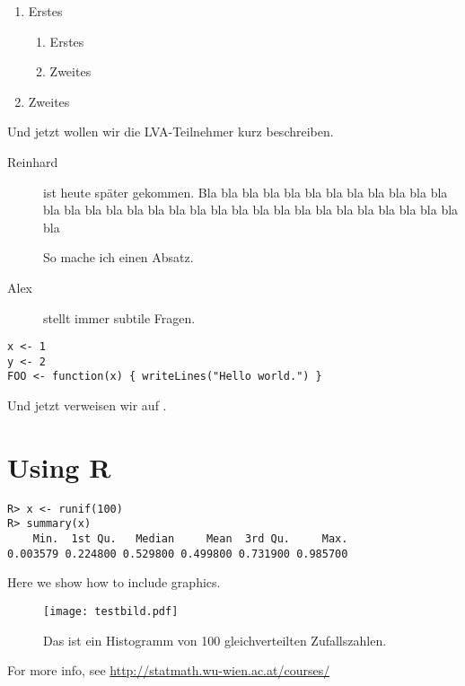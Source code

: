 \documentclass{article}
\begin{document}
\begin{enumerate}
 \item Erstes
  \begin{enumerate}
 \item Erstes
 \item Zweites
\end{enumerate}

 \item Zweites
\end{enumerate}

Und jetzt wollen wir die LVA-Teilnehmer kurz beschreiben.
\begin{description}
 \item[Reinhard] ist heute sp\"ater gekommen.  Bla bla bla bla bla bla
  bla bla bla bla bla bla bla bla bla bla bla bla bla bla bla bla bla
  bla bla bla bla bla bla bla bla bla bla

  So mache ich einen Absatz.
  
 \item[Alex] stellt immer subtile Fragen.
\end{description}

\begin{verbatim}
x <- 1
y <- 2
FOO <- function(x) { writeLines("Hello world.") }
\end{verbatim}

Und jetzt verweisen wir auf \cite{test:Walchhofer:2005}.

\section{Using R}

\begin{verbatim}
R> x <- runif(100)
R> summary(x)
    Min.  1st Qu.   Median     Mean  3rd Qu.     Max. 
0.003579 0.224800 0.529800 0.499800 0.731900 0.985700 
\end{verbatim}

Here we show how to include graphics.

\begin{figure}
  \centering
  \texttt{[image: testbild.pdf]}  
  \caption{Das ist ein Histogramm von 100 gleichverteilten Zufallszahlen.}
  \label{fig:testbild}
\end{figure}

For more info, see \url{http://statmath.wu-wien.ac.at/courses/}



\end{document}
